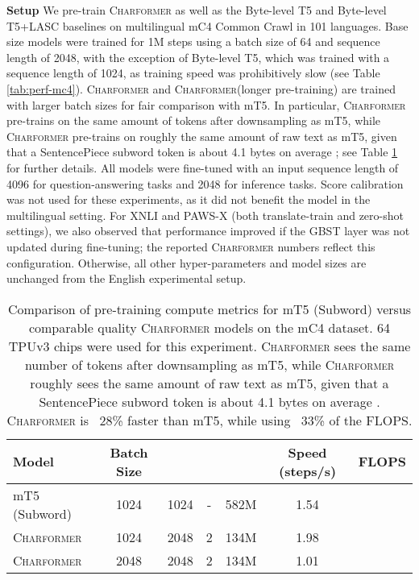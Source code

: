 \documentclass{article} \usepackage{iclr2022_conference,times}
\newcommand{\charformer}{\textsc{Charformer}\xspace}
\newcommand{\charformertall}{\textsc{Charformer}\xspace}
\newcommand{\charformertalllong}{\textsc{Charformer}\xspace}
\newcommand{\byte}{Byte-level T5\xspace}
\newcommand{\bytebase}{Byte-level T5\xspace}
\newcommand{\canine}{Byte-level T5+LASC\xspace}
\begin{document}
\noindent \textbf{Setup}  We pre-train \charformer as well as the \byte and \canine baselines on multilingual mC4 Common Crawl \citep{xue2020mt5} in 101 languages. Base size models were trained for 1M steps using a batch size of 64 and sequence length of 2048, with the exception of \bytebase, which was trained with a sequence length of 1024, as training speed was prohibitively slow (see Table \ref{tab:perf-mc4}). \charformertall and \charformertalllong (longer pre-training) are trained with larger batch sizes for fair comparison with mT5. In particular, \charformertall pre-trains on the same amount of tokens after downsampling as mT5, while \charformertalllong pre-trains on roughly the same amount of raw text as mT5, given that a SentencePiece subword token is about 4.1 bytes on average \citep{Xue2021byt5}; see Table \ref{tab:perfmc4} for further details. All models were fine-tuned with an input sequence length of 4096 for question-answering tasks and 2048 for inference tasks. Score calibration was not used for these experiments, as it did not benefit the model in the multilingual setting. For XNLI and PAWS-X (both translate-train and zero-shot settings), we also observed that performance improved if the GBST layer was not updated during fine-tuning; the reported \charformer numbers reflect this configuration. Otherwise, all other hyper-parameters and model sizes are unchanged from the English experimental setup.

\begin{table} \small
    \centering
    \caption{Comparison of pre-training compute metrics for mT5 (Subword) versus comparable quality \charformer models on the mC4 dataset. 64 TPUv3 chips were used for this experiment. \charformertall sees the same number of tokens after downsampling as mT5, while \charformertalllong roughly sees the same amount of raw text as mT5, given that a SentencePiece subword token is about 4.1 bytes on average \citep{Xue2021byt5}. \charformertall is ~28\% faster than mT5, while using ~33\% of the FLOPS.}
    \label{tab:perfmc4}
    \begin{tabular}{l c c c ccc}
    \toprule 
     Model & Batch Size &  &  &   & Speed (steps/s) & FLOPS \\
     \midrule
     mT5 (Subword) & 1024 & 1024 & - & 582M & 1.54 &  \\
      \charformertall & 1024 & 2048 & 2 & 134M & 1.98 & \\
      \charformertalllong & 2048 & 2048 & 2 & 134M & 1.01 & \\
      \bottomrule
    \end{tabular}
\end{table}
\end{document}
